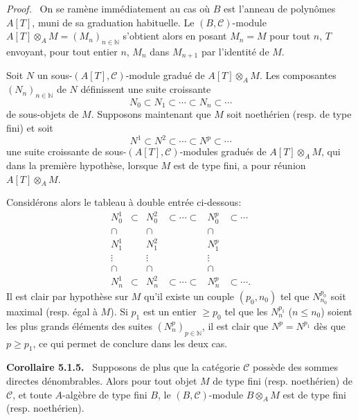\documentclass[11pt]{article}
\newenvironment{statement}[1]{\par\medskip\noindent\textbf{#1.}\ }{\par\medskip}
\newenvironment{prooftext}[1][Proof]{\par\noindent\emph{#1.}\ }{\par\medskip}
\begin{document}
\begin{prooftext}
On se ramène immédiatement au cas où \(B\) est l'anneau de polynômes \(A[T]\), muni de sa graduation habituelle. Le \((B,\mathcal C)\)-module \(A[T]\otimes_A M=(M_n)_{n\in\mathbb N}\) s'obtient alors en posant \(M_n=M\) pour tout \(n\), \(T\) envoyant, pour tout entier \(n\), \(M_n\) dans \(M_{n+1}\) par l'identité de \(M\).

Soit \(N\) un sous-\((A[T],\mathcal C)\)-module gradué de \(A[T]\otimes_A M\). Les composantes \((N_n)_{n\in\mathbb N}\) de \(N\) définissent une suite croissante
\[
N_0\subset N_1\subset\cdots\subset N_n\subset\cdots
\]
de sous-objets de \(M\). Supposons maintenant que \(M\) soit noethérien (resp. de type fini) et soit
\[
N^1\subset N^2\subset\cdots\subset N^p\subset\cdots
\]
une suite croissante de sous-\((A[T],\mathcal C)\)-modules gradués de \(A[T]\otimes_A M\), qui dans la première hypothèse, lorsque \(M\) est de type fini, a pour réunion \(A[T]\otimes_A M\).

Considérons alors le tableau à double entrée ci-dessous:
\[
\begin{array}{cccccc}
N_0^1&\subset&N_0^2&\subset\cdots\subset&N_0^p&\subset\cdots\\
\cap&&\cap&&\cap\\
N_1^1&&N_1^2&&N_1^p\\
\vdots&&\vdots&&\vdots\\
\cap&&\cap&&\cap\\
N_n^1&\subset&N_n^2&\subset\cdots\subset&N_n^p&\subset\cdots .
\end{array}
\]
Il est clair par hypothèse sur \(M\) qu'il existe un couple \((p_0,n_0)\) tel que \(N^{p_0}_{n_0}\) soit maximal (resp. égal à \(M\)). Si \(p_1\) est un entier \(\ge p_0\) tel que les \(N_n^{p_1}\) (\(n\le n_0\)) soient les plus grands éléments des suites \((N_n^p)_{p\in\mathbb N}\), il est clair que \(N^p=N^{p_1}\) dès que \(p\ge p_1\), ce qui permet de conclure dans les deux cas.
\end{prooftext}

\begin{statement}{Corollaire 5.1.5}
Supposons de plus que la catégorie \(\mathcal C\) possède des sommes directes dénombrables. Alors pour tout objet \(M\) de type fini (resp. noethérien) de \(\mathcal C\), et toute \(A\)-algèbre de type fini \(B\), le \((B,\mathcal C)\)-module \(B\otimes_A M\) est de type fini (resp. noethérien).
\end{statement}
\end{document}
